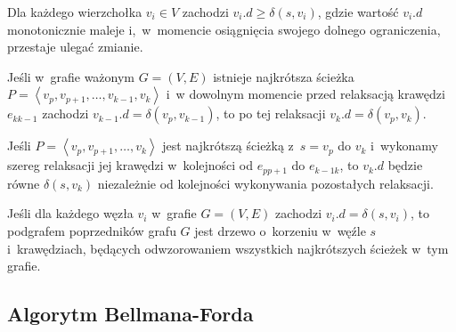 \begin{lemma}\label{lem:costUpperBound}
Dla każdego wierzchołka $v_{i} \in V$ zachodzi $ v_{i}.d \geqslant \delta \left( s , v_{i} \right)$, gdzie wartość $v_{i}.d$ monotonicznie maleje i,~w~momencie osiągnięcia swojego dolnego ograniczenia, przestaje ulegać zmianie.
\end{lemma}

\begin{lemma}\label{lem:convergenceProperty}
Jeśli w~grafie ważonym $G = \left( V, E \right)$ istnieje najkrótsza ścieżka $P = \left \langle v_{p}, v_{p+1}, \ldots, v_{k-1}, v_{k} \right \rangle $ i~w dowolnym momencie przed relaksacją krawędzi $e_{kk-1}$ zachodzi $ v_{k-1}.d = \delta \left( v_{p}, v_{k-1} \right)$, to po tej relaksacji $ v_{k}.d = \delta \left( v_{p}, v_{k} \right)$.
\end{lemma}

\begin{lemma}\label{lem:pathRelaxation}
Jeśli $P = \left \langle v_{p}, v_{p+1}, \ldots, v_{k} \right \rangle $ jest najkrótszą ścieżką z~$s = v_{p}$ do $v_{k}$ i~wykonamy szereg relaksacji jej krawędzi w~kolejności od $e_{pp+1}$ do $e_{k-1k}$, to $v_{k}.d$ będzie równe $ \delta \left( s, v_{k}\right)$ niezależnie od kolejności wykonywania pozostałych relaksacji.
\end{lemma}

\begin{lemma}\label{lem:parentSubgraph}
Jeśli dla każdego węzła $v_{i}$ w~grafie $G = \left( V, E \right)$ zachodzi $v_{i}.d = \delta \left( s, v_{i} \right)$, to podgrafem poprzedników grafu $G$ jest drzewo o~korzeniu w~węźle $s$ i~krawędziach, będących odwzorowaniem wszystkich najkrótszych ścieżek w~tym grafie.
\end{lemma}

\subsection{Algorytm Bellmana-Forda}

